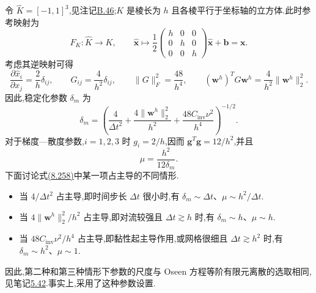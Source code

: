 \begin{example}[立方体的棱平行于坐标轴]
\label{ex:vms-axis-aligned-cube}
令 $\widehat K=[-1,1]^3$,见注记\hyperref[note:appendix-b-46]{B.46};$K$ 是棱长为 $h$ 且各棱平行于坐标轴的立方体.此时参考映射为
\[
 F_K:\widehat K\to K,\qquad
 \widehat{\bm{x}}\mapsto
 \frac12\begin{pmatrix}h&0&0\\0&h&0\\0&0&h\end{pmatrix}
 \widehat{\bm{x}}+\bm{b}=\bm{x}.
\]
考虑其逆映射可得
\[
 \frac{\partial\widehat{x}_i}{\partial x_j}
 =\frac2h\delta_{ij},\qquad
 G_{ij}=\frac4{h^2}\delta_{ij},\qquad
 \|G\|_F^2=\frac{48}{h^4},\qquad
 (\bm{w}^h)^TG\bm{w}^h
 =\frac4{h^2}\|\bm{w}^h\|_2^2.
\]
因此,稳定化参数 $\delta_m$ 为
\begin{equation}\label{eq:vms-cube-momentum-stabilization-parameter}
 \delta_m=\left(
 \frac4{\Delta t^2}
 +\frac{4\|\bm{w}^h\|_2^2}{h^2}
 +\frac{48C_{\mathrm{inv}}\nu^2}{h^4}
 \right)^{-1/2}.
\end{equation}
对于梯度—散度参数,$i=1,2,3$ 时 $g_i=2/h$,因而
$\bm{g}^T\bm{g}=12/h^2$,并且
\begin{equation}\label{eq:vms-cube-grad-div-stabilization-parameter}
 \mu=\frac{h^2}{12\delta_m}.
\end{equation}
下面讨论式\hyperref[eq:vms-cube-momentum-stabilization-parameter]{(8.258)}中某一项占主导的不同情形.
\begin{itemize}
 \item 当 $4/\Delta t^2$ 占主导,即时间步长 $\Delta t$ 很小时,有
 $\delta_m\sim\Delta t$、$\mu\sim h^2/\Delta t$.
 \item 当 $4\|\bm{w}^h\|_2^2/h^2$ 占主导,即对流较强且
 $\Delta t\gtrsim h$ 时,有 $\delta_m\sim h$、$\mu\sim h$.
 \item 当 $48C_{\mathrm{inv}}\nu^2/h^4$ 占主导,即黏性起主导作用,或网格很细且 $\Delta t\gtrsim h^2$ 时,有 $\delta_m\sim h^2$、$\mu\sim1$.
\end{itemize}
因此,第二种和第三种情形下参数的尺度与 Oseen 方程等阶有限元离散的选取相同,见笔记\hyperref[note:oseen-optimal-stabilization]{5.42}.事实上,\textcite{Bazilevs2007}采用了这种参数设置.
\end{example}


